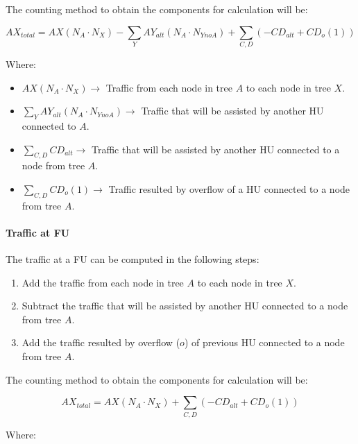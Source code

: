 \documentclass[../main.tex]{subfiles}
\begin{document}
The counting method to obtain the components for calculation will be:

$$
	AX_{total} = AX (N_A \cdot N_X) - \sum_Y AY_{alt} (N_A \cdot N_{YnoA}) + \sum_{C, D} \left( - CD_{alt} + CD_o (1) \right)
$$

Where:

\begin{itemize}
	\item $AX (N_A \cdot N_X) \rightarrow$ Traffic from each node in tree $A$ to each node in tree $X$.
	\item $\sum_Y AY_{alt} (N_A \cdot N_{YnoA}) \rightarrow$ Traffic that will be assisted by another HU connected to $A$.
	\item $\sum_{C, D} CD_{alt} \rightarrow$ Traffic that will be assisted by another HU connected to a node from tree $A$.
	\item $\sum_{C, D} CD_o (1) \rightarrow$ Traffic resulted by overflow of a HU connected to a node from tree $A$.
\end{itemize}

\paragraph{Traffic at FU}

The traffic at a FU can be computed in the following steps:
\begin{enumerate}
	\item Add the traffic from each node in tree $A$ to each node in tree $X$.
	\item Subtract the traffic that will be assisted by another HU connected to a node from tree $A$.
	\item Add the traffic resulted by overflow ($o$) of previous HU connected to a node from tree $A$.
\end{enumerate}

The counting method to obtain the components for calculation will be:

$$
	AX_{total} = AX (N_A \cdot N_X) + \sum_{C, D} \left( - CD_{alt} + CD_o (1) \right)
$$

Where:
\end{document}
